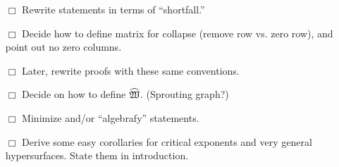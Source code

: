 \documentclass[11pt]{amsart}
\begin{document}
{\begin{enumerate}
\item[$\Box$] Rewrite statements in terms of ``shortfall.''
\item[$\Box$] Decide how to define matrix for collapse (remove row vs. zero row), and point out no zero columns. 
\item[$\Box$] Later, rewrite proofs with these same conventions.
 \item[$\Box$] Decide on how to define $\widehat{\mathfrak{W}}$.  (Sprouting graph?)
 \item[$\Box$] Minimize and/or ``algebrafy'' statements.
 \item[$\Box$] Derive some easy corollaries for critical exponents and very general hypersurfaces.  State them in introduction. 

\end{enumerate}
}
\end{document}
